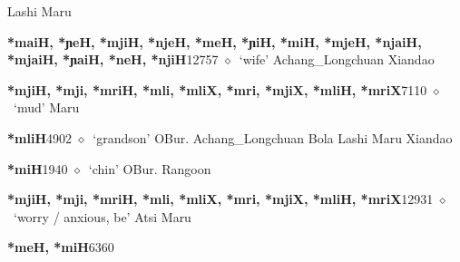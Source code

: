\begin{list}{}{\leftmargin=1.5em \itemindent=-1.5em}
\hspace{1ex}
         Lashi 
\hspace{1ex}
         Maru 
  \item {\footnotesize \textbf{*maiH, *ɲeH, *mjiH, *njeH, *meH, *ɲiH, *miH, *mjeH, *njaiH, *mjaiH, *ɲaiH, *neH, *njiH}}{\tiny 12757}
\hspace{1ex}
         $\diamond$~`wife'
         Achang\_Longchuan 
\hspace{1ex}
         Xiandao 
  \item {\footnotesize \textbf{*mjiH, *mji, *mriH, *mli, *mliX, *mri, *mjiX, *mliH, *mriX}}{\tiny 7110}
\hspace{1ex}
         $\diamond$~`mud'
         Maru 
  \item {\footnotesize \textbf{*mliH}}{\tiny 4902}
\hspace{1ex}
         $\diamond$~`grandson'
         OBur. 
\hspace{1ex}
         Achang\_Longchuan 
\hspace{1ex}
         Bola 
\hspace{1ex}
         Lashi 
\hspace{1ex}
         Maru 
\hspace{1ex}
         Xiandao 
  \item {\footnotesize \textbf{*miH}}{\tiny 1940}
\hspace{1ex}
         $\diamond$~`chin'
         OBur. 
\hspace{1ex}
         Rangoon 
  \item {\footnotesize \textbf{*mjiH, *mji, *mriH, *mli, *mliX, *mri, *mjiX, *mliH, *mriX}}{\tiny 12931}
\hspace{1ex}
         $\diamond$~`worry / anxious, be'
         Atsi 
\hspace{1ex}
         Maru 
  \item {\footnotesize \textbf{*meH, *miH}}{\tiny 6360}
\hspace{1ex}

\end{list}
